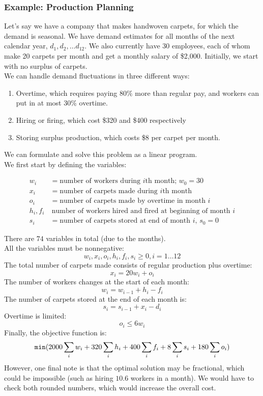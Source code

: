 \subsubsection{Example: Production Planning}
Let's say we have a company that makes handwoven carpets, for which the demand is seasonal.
We have demand estimates for all months of the next calendar year, $d_1, d_2,\ldots d_{12}$.
We also currently have 30 employees, each of whom make 20 carpets per month and get a monthly salary of \$2,000.
Initially, we start with no surplus of carpets.\\
We can handle demand fluctuations in three different ways:
\begin{enumerate}
  \item Overtime, which requires paying $80\%$ more than regular pay, and workers can put in at most $30\%$ overtime.
  \item Hiring or firing, which cost \$320 and \$400 respectively
  \item Storing surplus production, which costs \$8 per carpet per month.
\end{enumerate}
We can formulate and solve this problem as a linear program.\\
We first start by defining the variables:
\begin{center}
  \begin{align*}
    w_i &= \text{number of workers during $i$th month; $w_0 = 30$}\\
    x_i &=  \text{number of carpets made during $i$th month}\\
    o_i &= \text{number of carpets made by overtime in month $i$}\\
    h_i, f_i &\ \text{number of workers hired and fired at beginning of month $i$}\\
  s_i &= \text{number of carpets stored at end of month $i$, $s_0 = 0$}
  \end{align*}
\end{center}
There are $74$ variables in total (due to the months).\\
All the variables must be nonnegative: $$w_i, x_i, o_i, h_i, f_i, s_i \geq 0, i = 1\ldots 12$$
The total number of carpets made consists of regular production plus overtime: $$x_i = 20 w_i + o_i$$
The number of workers changes at the start of each month: $$w_i = w_{i-1} + h_i - f_i$$
The number of carpets stored at the end of each month is: $$s_i = s_{i-1} + x_i - d_i$$
Overtime is limited: $$o_i \leq 6 w_i$$
Finally, the objective function is: $$\verb|min| (2000 \sum_i w_i + 320 \sum_i h_i + 400 \sum_i f_i + 8 \sum_i s_i + 180 \sum_i o_i)$$
However, one final note is that the optimal solution may be fractional, which could be impossible (such as hiring $10.6$ workers in a month).
We would have to check both rounded numbers, which would increase the overall cost.

